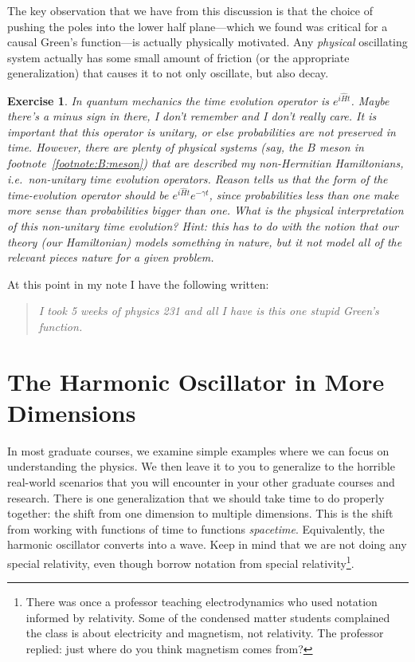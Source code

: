 \documentclass[
  11pt,
	colorful,
	raggedright,
]{tufte-style-thesis-flip}
\newtheorem{exercise}{Exercise}[section]
\begin{document}
 The key observation that we have from this discussion is that the choice of pushing the poles into the lower half plane---which we found was critical for a causal Green's function---is actually physically motivated. Any \emph{physical} oscillating system actually has some small amount of friction (or the appropriate generalization) that causes it to not only oscillate, but also decay. 
 \begin{exercise}
 In quantum mechanics the time evolution operator is $e^{i\hat H t}$. Maybe there's a minus sign in there, I don't remember and I don't really care. It is important that this operator is unitary, or else probabilities are not preserved in time. However, there are plenty of physical systems (say, the $B$ meson in footnote~\ref{footnote:B:meson}) that \emph{are} described my non-Hermitian Hamiltonians, i.e.~non-unitary time evolution operators. Reason tells us that the form of the time-evolution operator should be $e^{i\hat H t}e^{-\gamma t}$, since probabilities less than one make more sense than probabilities bigger than one. What is the physical interpretation of this non-unitary time evolution? Hint: this has to do with the notion that our theory (our Hamiltonian) models something in nature, but it not model \emph{all} of the relevant pieces nature for a given problem.
 \end{exercise}
 At this point in my note I have the following written:
 \begin{quote}
 \emph{I took 5 weeks of physics 231 and all I have is this one stupid Green's function.}
 \end{quote}
 
 
 
\chapter{The Harmonic Oscillator in More Dimensions}



In most graduate courses, we examine simple examples where we can focus on understanding the physics. We then leave it to you to generalize to the horrible real-world scenarios that you will encounter in your other graduate courses and research. There is one generalization that we should take time to do properly together: the shift from one dimension to multiple dimensions. This is the shift from working with functions of time to functions \emph{spacetime}. Equivalently, the harmonic oscillator converts into a wave.
%
Keep in mind that we are not doing any special relativity, even though borrow notation from special relativity\footnote{There was once a professor teaching electrodynamics who used notation informed by relativity. Some of the condensed matter students complained the class is about electricity and magnetism, not relativity. The professor replied: just where do you think magnetism comes from?}. 
\end{document}
